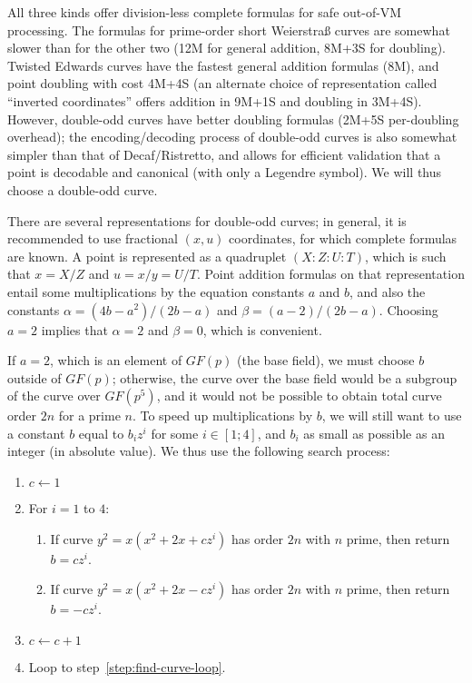 \documentclass{llncs}
\newcommand{\GF}{GF}
\begin{document}
All three kinds offer division-less complete formulas for safe out-of-VM
processing. The formulas for prime-order short Weierstraß
curves\cite{RenCosBat2015} are somewhat slower than for the other two
(12M for general addition, 8M+3S for doubling). Twisted Edwards curves
have the fastest general addition formulas (8M), and point doubling with
cost 4M+4S (an alternate choice of representation called ``inverted
coordinates'' offers addition in 9M+1S and doubling in 3M+4S). However,
double-odd curves have better doubling formulas (2M+5S per-doubling
overhead); the encoding/decoding process of double-odd curves is also
somewhat simpler than that of Decaf/Ristretto, and allows for efficient
validation that a point is decodable and canonical (with only a Legendre
symbol). We will thus choose a double-odd curve.

There are several representations for double-odd curves; in general, it
is recommended to use fractional $(x, u)$ coordinates, for which
complete formulas are known. A point is represented as a quadruplet
$(X{:}Z{:}U{:}T)$, which is such that $x = X/Z$ and $u = x/y = U/T$.
Point addition formulas on that representation entail some
multiplications by the equation constants $a$ and $b$, and also the
constants $\alpha = (4b - a^2)/(2b - a)$ and $\beta = (a - 2)/(2b - a)$.
Choosing $a = 2$ implies that $\alpha = 2$ and $\beta = 0$, which is
convenient.

If $a = 2$, which is an element of $\GF(p)$ (the base field), we must
choose $b$ outside of $\GF(p)$; otherwise, the curve over the base
field would be a subgroup of the curve over $\GF(p^5)$, and it would
not be possible to obtain total curve order $2n$ for a prime $n$. To
speed up multiplications by $b$, we will still want to use a constant
$b$ equal to $b_i z^i$ for some $i \in [1;4]$, and $b_i$ as small as
possible as an integer (in absolute value). We thus use the following
search process:
\begin{enumerate}

    \item $c \leftarrow 1$

    \item \label{step:find-curve-loop}For $i = 1$ to $4$:
    \begin{enumerate}

        \item If curve $y^2 = x(x^2 + 2x + c z^i)$ has order $2n$ with
        $n$ prime, then return $b = c z^i$.

        \item If curve $y^2 = x(x^2 + 2x - c z^i)$ has order $2n$ with
        $n$ prime, then return $b = -c z^i$.

    \end{enumerate}

    \item $c \leftarrow c + 1$

    \item Loop to step~\ref{step:find-curve-loop}.

\end{enumerate}
\end{document}
